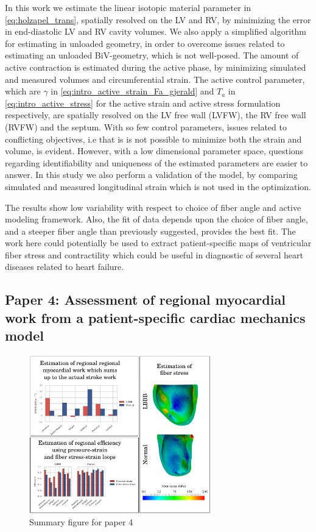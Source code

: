 In this work we estimate the linear isotopic material parameter in
\eqref{eq:holzapel_trans}, spatially resolved on the LV and RV, by
minimizing the error in end-diastolic LV and RV cavity volumes. We also
apply a simplified algorithm for estimating in unloaded geometry, in
order to overcome issues related to estimating an unloaded
BiV-geometry, which is not well-posed. The amount of active
contraction is estimated during the active phase, by minimizing
simulated and measured volumes and circumferential strain. The active
control parameter, which are $\gamma$ in
\eqref{eq:intro_active_strain_Fa_gjerald}  and $T_a$ in
\eqref{eq:intro_active_stress} for the active strain and active stress
formulation respectively, are spatially resolved on the
LV free wall (LVFW), the RV free wall (RVFW) and the septum. With so
few control parameters, issues related to conflicting objectives, i.e
that is is not possible to minimize both the strain and volume, is
evident. However, with a low dimensional parameter space, questions
regarding identifiability and uniqueness of the estimated parameters
are easier to answer. In this study we also perform a validation of
the model, by comparing simulated and measured longitudinal strain
which is not used in the optimization. 

The results show low variability with respect to choice of fiber angle
and active modeling framework. Also, the fit of data depends upon the
choice of fiber angle, and a steeper fiber angle than previously
suggested, provides the best fit. The work here could potentially be
used to extract patient-specific maps of ventricular fiber stress and
contractility which could be useful in diagnostic of several heart
diseases related to heart failure. 




\subsection{Paper 4: Assessment of regional myocardial work from a
  patient-specific cardiac mechanics model}

\begin{figure}[htbp]
  \centering
    \includegraphics[width=0.7\textwidth]{chapters/introduction/figures/paper4}
\caption{Summary figure for paper 4}
\label{fig:paper3}
\end{figure}


